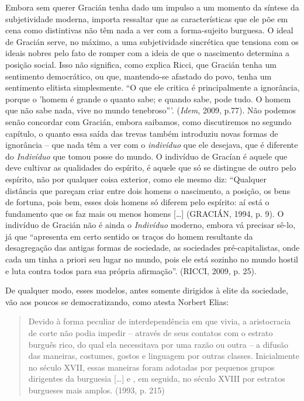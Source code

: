 Embora sem querer Gracián tenha dado um impulso a um momento da síntese
da subjetividade moderna, importa ressaltar que as características que
ele põe em cena como distintivas não têm nada a ver com a forma-sujeito
burguesa. O ideal de Gracián serve, no máximo, a uma subjetividade
sincrética que tensiona com os ideais nobres pelo fato de romper com a
ideia de que o nascimento determina a posição social. Isso não
significa, como explica Ricci, que Gracián tenha um sentimento
democrático, ou que, mantendo-se afastado do povo, tenha um sentimento
elitista simplesmente. ``O que ele critica é principalmente a
ignorância, porque o 'homem é grande o quanto sabe; e quando sabe, pode
tudo. O homem que não sabe nada, vive no mundo tenebroso'''.
(\emph{Idem}, 2009, p.77). Não podemos senão concordar com Gracián,
embora saibamos, como discutiremos no segundo capítulo, o quanto essa
saída das trevas também introduziu novas formas de ignorância -- que
nada têm a ver com o \emph{indivíduo} que ele desejava, que é diferente
do \emph{Indivíduo} que tomou posse do mundo. O indivíduo de Gracían é
aquele que deve cultivar as qualidades do espírito, é aquele que só se
distingue de outro pelo espírito, não por qualquer coisa exterior, como
ele mesmo diz: ``Qualquer distância que pareçam criar entre dois homens
o nascimento, a posição, os bens de fortuna, pois bem, esses dois homens
só diferem pelo espírito: aí está o fundamento que os faz mais ou menos
homens {[}\ldots{}{]} (GRACIÁN, 1994, p. 9). O indivíduo de Gracián não
é ainda o \emph{Indivíduo} moderno, embora vá precisar sê-lo, já que
``apresenta em certo sentido os traços do homem resultante da
desagregação das antigas formas de sociedade, as sociedades
pré-capitalistas, onde cada um tinha a priori seu lugar no mundo, pois
ele está sozinho no mundo hostil e luta contra todos para sua própria
afirmação''. (RICCI, 2009, p. 25).

De qualquer modo, esses modelos, antes somente dirigidos à elite da
sociedade, vão aos poucos se democratizando, como atesta Norbert Elias:

\begin{quote}
Devido à forma peculiar de interdependência em que vivia, a aristocracia
de corte não podia impedir -- através de seus contatos com o estrato
burguês rico, do qual ela necessitava por uma razão ou outra -- a
difusão das maneiras, costumes, gostos e linguagem por outras classes.
Inicialmente no século XVII, essas maneiras foram adotadas por pequenos
grupos dirigentes da burguesia {[}\ldots{}{]} e , em seguida, no século
XVIII por estratos burgueses mais amplos. (1993, p. 215)
\end{quote}

